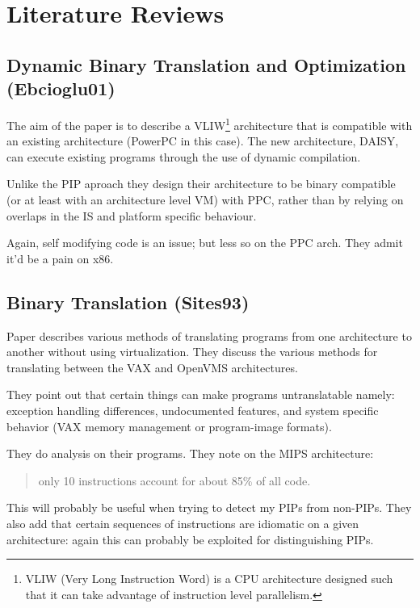 \section{Literature Reviews}

\subsection{Dynamic Binary Translation and Optimization (Ebcioglu01)}

The aim of the paper is to describe a VLIW\footnote{VLIW (Very Long
  Instruction Word) is a CPU architecture designed such that it can take
  advantage of instruction level parallelism.} architecture that is
compatible with an existing architecture (PowerPC in this case). The new
architecture, DAISY, can execute existing programs through the use of
dynamic compilation.

Unlike the PIP aproach they design their architecture to be binary
compatible (or at least with an architecture level VM) with PPC, rather
than by relying on overlaps in the IS and platform specific behaviour.

Again, self modifying code is an issue; but less so on the PPC arch.
They admit it'd be a pain on x86.

\subsection{Binary Translation (Sites93)}

Paper describes various methods of translating programs from one
architecture to another without using virtualization. They discuss the
various methods for translating between the VAX and OpenVMS
architectures.

They point out that certain things can make programs untranslatable
namely: exception handling differences, undocumented features, and
system specific behavior (VAX memory management or program-image
formats).

They do analysis on their programs. They note on the MIPS architecture:

\begin{quote}
only 10 instructions account for about 85\% of all code.

\end{quote}
This will probably be useful when trying to detect my PIPs from
non-PIPs. They also add that certain sequences of instructions are
idiomatic on a given architecture: again this can probably be exploited
for distinguishing PIPs.

